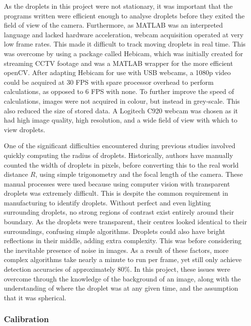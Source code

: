 \documentclass{physics_article_B}
\begin{document}
        As the droplets in this project were not stationary, it was important that the programs written were efficient enough to analyse droplets before they exited the field of view of the camera. Furthermore, as MATLAB was an interpreted language and lacked hardware acceleration, webcam acquisition operated at very low frame rates. This made it difficult to track moving droplets in real time. This was overcome by using a package called Hebicam\cite{HebiCam}, which was initially created for streaming CCTV footage and was a MATLAB wrapper for the more efficient openCV\cite{opencv}. After adapting Hebicam for use with USB webcams, a 1080p video could be acquired at 30 FPS with spare processor overhead to perform calculations, as opposed to 6 FPS with none. To further improve the speed of calculations, images were not acquired in colour, but instead in grey-scale. This also reduced the size of stored data. A Logitech C920 webcam was chosen as it had high image quality, high resolution, and a wide field of view with which to view droplets. 
            
        One of the significant difficulties encountered during previous studies involved quickly computing the radius of droplets. Historically, authors have manually counted the width of droplets in pixels, before converting this to the real world distance $R$, using simple trigonometry and the focal length of the camera. These manual processes were used because using computer vision with transparent droplets was extremely difficult. This is despite the common requirement in manufacturing to identify droplets\cite{bubblegeneral}. Without perfect and even lighting surrounding droplets, no strong regions of contrast exist entirely around their boundary. As the droplets were transparent, their centres looked identical to their surroundings, confusing simple algorithms\cite{bubblegeneral}. Droplets could also have bright reflections in their middle, adding extra complexity. This was before considering the inevitable presence of noise in images. As a result of these factors, more complex algorithms take nearly a minute to run per frame, yet still only achieve detection accuracies of approximately 80\%\cite{bubble2}. In this project, these issues were overcome through the knowledge of the background of an image, along with the understanding of where the droplet was at any given time, and the assumption that it was spherical. 

        \subsubsection{Calibration\label{sect:method:vision:calib}}
\end{document}
